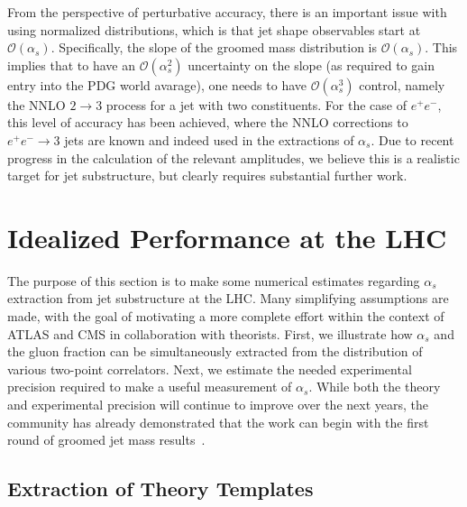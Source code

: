\documentclass[11pt]{cernrep}
\begin{document}
From the perspective of perturbative accuracy, there is an important issue with using normalized distributions, which is that jet shape observables start at $\mathcal{O}(\alpha_s)$.
%
Specifically, the slope of the groomed mass distribution is $\mathcal{O}(\alpha_s)$.
%
This implies that to have an $\mathcal{O}(\alpha_s^2)$ uncertainty on the slope (as required to gain entry into the PDG world avarage), one needs to have $\mathcal{O}(\alpha_s^3)$ control, namely the NNLO $2 \to 3$ process for a jet with two constituents.
%
For the case of $e^+e^-$, this level of accuracy has been achieved, where the NNLO corrections to $e^+e^-\to 3$ jets are known and indeed used in the extractions of $\alpha_s$.
%
Due to recent progress in the calculation of the relevant amplitudes, we believe this is a realistic target for jet substructure, but clearly requires substantial further work.

\section{Idealized Performance at the LHC}
\label{jetsub_alphas_sec:ben_study}

The purpose of this section is to make some numerical estimates regarding $\alpha_s$ extraction from jet substructure at the LHC.
%
Many simplifying assumptions are made, with the goal of motivating a more complete effort within the context of ATLAS and CMS in collaboration with theorists.
%
First, we illustrate how $\alpha_s$ and the gluon fraction can be simultaneously extracted from the distribution of various two-point correlators.
%
Next, we estimate the needed experimental precision required to make a useful measurement of $\alpha_s$.
%
While both the theory and experimental precision will continue to improve over the next years, the community has already demonstrated that the work can begin with the first round of groomed jet mass results~\cite{Aaboud:2017qwh,CMS-PAS-SMP-16-010,Frye:2016aiz,Frye:2016okc,Marzani:2017mva,Marzani:2017kqd}.

\subsection{Extraction of Theory Templates}
\label{jetsub_alphas_sec:templates}
\end{document}
